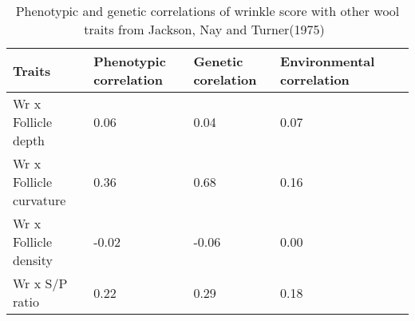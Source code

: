 %

\begin{table}[h]
\centering
\caption{Phenotypic and genetic correlations of wrinkle score with other wool traits from Jackson, Nay and Turner(1975)~\cite{jack:75}}
\label{tab:jnt75}
\vspace{0.1in}
\begin{tabular}{|p{1.2in}|p{0.8in}|p{0.8in}|p{0.8in}|p{0.8in}|}  \hline
  Traits  & Phenotypic correlation  & Genetic corelation & Environmental correlation  \\  \hline
 Wr x Follicle depth  & 0.06 & 0.04 & 0.07  \\
 Wr x Follicle curvature & 0.36 & 0.68 & 0.16 \\
 Wr x Follicle density & -0.02 & -0.06 & 0.00 \\
 Wr x S/P ratio & 0.22 & 0.29 & 0.18 \\ \hline
\end{tabular}
\end{table}

%
